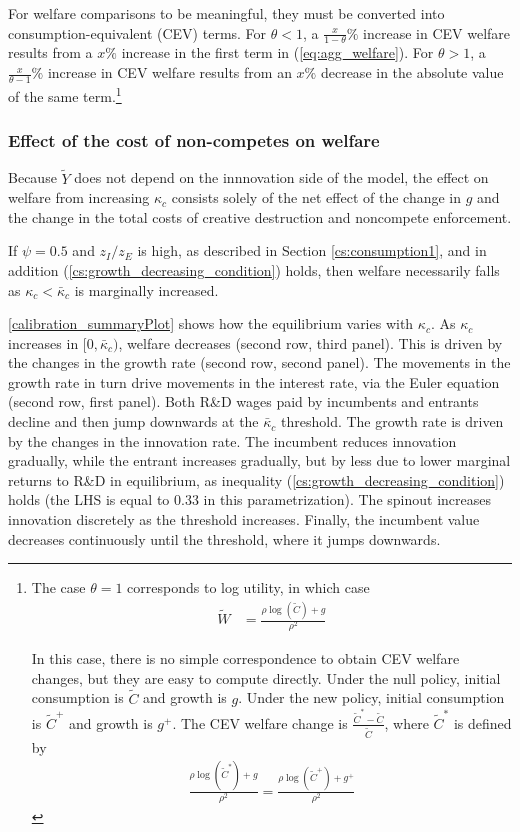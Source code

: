 \documentclass[11pt,english]{article}
\theoremstyle{remark}
\begin{document}
For welfare comparisons to be meaningful, they must be converted into consumption-equivalent (CEV) terms. For $\theta < 1$, a $\frac{x}{1-\theta}\%$ increase in CEV welfare results from a $x\%$ increase in the first term in (\ref{eq:agg_welfare}). For $\theta > 1$, a $\frac{x}{\theta-1}\%$ increase in CEV welfare results from an $x\%$ decrease in the absolute value of the same term.\footnote{The case $\theta = 1$ corresponds to log utility, in which case
	\begin{align}
	\tilde{W} &= \frac{\rho \log(\tilde{C}) + g}{\rho^2} \label{eq:agg_welfare_log}
	\end{align}
	
	In this case, there is no simple correspondence to obtain CEV welfare changes, but they are easy to compute directly. Under the null policy, initial consumption is $\tilde{C}$ and growth is $g$. Under the new policy, initial consumption is $\tilde{C}^+$ and growth is $g^+$. The CEV welfare change is $\frac{\tilde{C}^* - \tilde{C}}{\tilde{C}}$, where $\tilde{C}^*$ is defined by 
	\begin{align}
	\frac{\rho\log(\tilde{C}^*) + g}{\rho^2} = \frac{\rho \log(\tilde{C}^+) + g^+}{\rho^2} \label{eq:agg_welfare_log_CEV}
	\end{align}}

\subsubsection{Effect of the cost of non-competes on welfare}

Because $\tilde{Y}$ does not depend on the innnovation side of the model, the effect on welfare from increasing $\kappa_c$ consists solely of the net effect of the change in $g$ and the change in the total costs of creative destruction and noncompete enforcement.

If $\psi = 0.5$ and $z_I / z_E$ is high, as described in Section \ref{cs:consumption1}, and in addition (\ref{cs:growth_decreasing_condition}) holds, then welfare necessarily falls as $\kappa_c < \bar{\kappa}_c$ is marginally increased. 

\autoref{calibration_summaryPlot} shows how the equilibrium varies with $\kappa_c$. As $\kappa_c$ increases in $[0,\bar{\kappa}_c)$, welfare decreases (second row, third panel). This is driven by the changes in the growth rate (second row, second panel). The movements in the growth rate in turn drive movements in the interest rate, via the Euler equation (second row, first panel). Both R\&D wages paid by incumbents and entrants decline and then jump downwards at the $\bar{\kappa}_c$ threshold. The growth rate is driven by the changes in the innovation rate. The incumbent reduces innovation gradually, while the entrant increases gradually, but by less due to lower marginal returns to R\&D in equilibrium, as inequality (\ref{cs:growth_decreasing_condition}) holds (the LHS is equal to 0.33 in this parametrization). The spinout increases innovation discretely as the threshold increases. Finally, the incumbent value decreases continuously until the threshold, where it jumps downwards.
\end{document}

